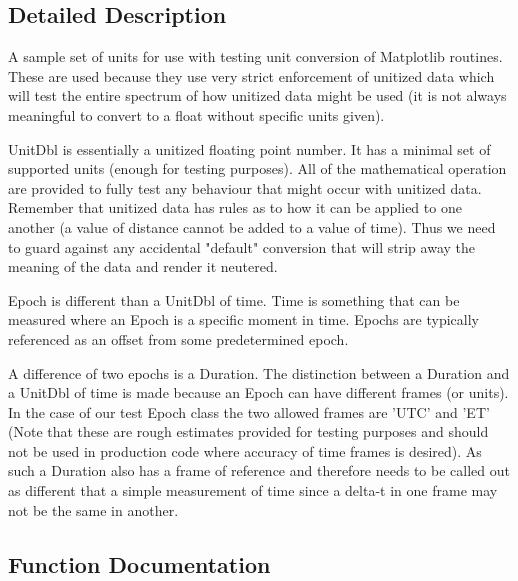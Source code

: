\subsection{Detailed Description}
\begin{DoxyVerb}A sample set of units for use with testing unit conversion
of Matplotlib routines.  These are used because they use very strict
enforcement of unitized data which will test the entire spectrum of how
unitized data might be used (it is not always meaningful to convert to
a float without specific units given).

UnitDbl is essentially a unitized floating point number.  It has a
minimal set of supported units (enough for testing purposes).  All
of the mathematical operation are provided to fully test any behaviour
that might occur with unitized data.  Remember that unitized data has
rules as to how it can be applied to one another (a value of distance
cannot be added to a value of time).  Thus we need to guard against any
accidental "default" conversion that will strip away the meaning of the
data and render it neutered.

Epoch is different than a UnitDbl of time.  Time is something that can be
measured where an Epoch is a specific moment in time.  Epochs are typically
referenced as an offset from some predetermined epoch.

A difference of two epochs is a Duration.  The distinction between a Duration
and a UnitDbl of time is made because an Epoch can have different frames (or
units).  In the case of our test Epoch class the two allowed frames are 'UTC'
and 'ET' (Note that these are rough estimates provided for testing purposes
and should not be used in production code where accuracy of time frames is
desired).  As such a Duration also has a frame of reference and therefore needs
to be called out as different that a simple measurement of time since a delta-t
in one frame may not be the same in another.
\end{DoxyVerb}
 

\subsection{Function Documentation}
\mbox{\label{namespacematplotlib_1_1testing_1_1jpl__units_ae5e86bf22e14304e26b47e66daf1188b}} 
